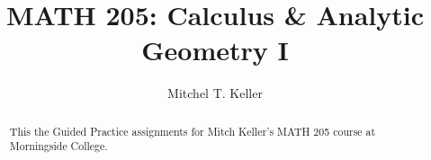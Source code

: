 \documentclass{xourse}
\title{MATH 205: Calculus \& Analytic Geometry I}
\author{Mitchel T. Keller}
\begin{document}
  
\begin{abstract} %
  This the Guided Practice assignments for Mitch Keller's MATH 205
  course at Morningside College.
\end{abstract}  
\maketitle  
 
 
\end{document}
